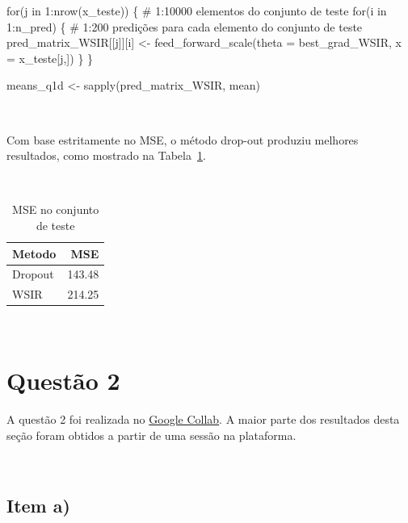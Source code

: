 \documentclass[
  a4paperpaper,
]{article}
\newenvironment{Shaded}{\begin{snugshade}}{\end{snugshade}}
\newcommand{\AttributeTok}[1]{\textcolor[rgb]{0.40,0.45,0.13}{#1}}
\newcommand{\CommentTok}[1]{\textcolor[rgb]{0.37,0.37,0.37}{#1}}
\newcommand{\ControlFlowTok}[1]{\textcolor[rgb]{0.00,0.23,0.31}{#1}}
\newcommand{\DecValTok}[1]{\textcolor[rgb]{0.68,0.00,0.00}{#1}}
\newcommand{\FunctionTok}[1]{\textcolor[rgb]{0.28,0.35,0.67}{#1}}
\newcommand{\NormalTok}[1]{\textcolor[rgb]{0.00,0.23,0.31}{#1}}
\newcommand{\OtherTok}[1]{\textcolor[rgb]{0.00,0.23,0.31}{#1}}
\newcommand{\SpecialCharTok}[1]{\textcolor[rgb]{0.37,0.37,0.37}{#1}}
\begin{document}
\begin{Shaded}
\begin{Highlighting}[]
\ControlFlowTok{for}\NormalTok{(j }\ControlFlowTok{in} \DecValTok{1}\SpecialCharTok{:}\FunctionTok{nrow}\NormalTok{(x\_teste)) \{ }\CommentTok{\# 1:10000 elementos do conjunto de teste}
  \ControlFlowTok{for}\NormalTok{(i }\ControlFlowTok{in} \DecValTok{1}\SpecialCharTok{:}\NormalTok{n\_pred) \{ }\CommentTok{\# 1:200 predições para cada elemento do conjunto de teste}
\NormalTok{    pred\_matrix\_WSIR[[j]][i] }\OtherTok{\textless{}{-}} \FunctionTok{feed\_forward\_scale}\NormalTok{(}\AttributeTok{theta =}\NormalTok{ best\_grad\_WSIR, }\AttributeTok{x =}\NormalTok{ x\_teste[j,])}
\NormalTok{  \}}
\NormalTok{\}}

\NormalTok{means\_q1d }\OtherTok{\textless{}{-}} \FunctionTok{sapply}\NormalTok{(pred\_matrix\_WSIR, mean)}
\end{Highlighting}
\end{Shaded}

~

Com base estritamente no MSE, o método drop-out produziu melhores
resultados, como mostrado na Tabela~\ref{tbl-mseq1cd}.

~

\begin{longtable}[]{@{}lr@{}}

\caption{\label{tbl-mseq1cd}MSE no conjunto de teste}

\tabularnewline

\toprule\noalign{}
Metodo & MSE \\
\midrule\noalign{}
\endhead
\bottomrule\noalign{}
\endlastfoot
Dropout & 143.48 \\
WSIR & 214.25 \\

\end{longtable}

~

\section{Questão 2}\label{questuxe3o-2}

A questão 2 foi realizada no
\href{https://colab.research.google.com/drive/1cYhcgZacw-x59x6bCt2duFvGixKCIALB?usp=sharing}{Google
Collab}. A maior parte dos resultados desta seção foram obtidos a partir
de uma sessão na plataforma.

~

\subsection{Item a)}\label{item-a}
\end{document}
